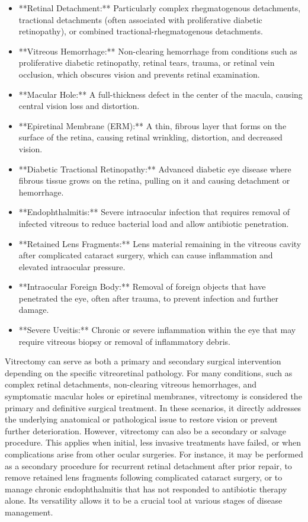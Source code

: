 \begin{itemize}
  \item **Retinal Detachment:** Particularly complex rhegmatogenous detachments, tractional detachments (often associated with proliferative diabetic retinopathy), or combined tractional-rhegmatogenous detachments.
  \item **Vitreous Hemorrhage:** Non-clearing hemorrhage from conditions such as proliferative diabetic retinopathy, retinal tears, trauma, or retinal vein occlusion, which obscures vision and prevents retinal examination.
  \item **Macular Hole:** A full-thickness defect in the center of the macula, causing central vision loss and distortion.
  \item **Epiretinal Membrane (ERM):** A thin, fibrous layer that forms on the surface of the retina, causing retinal wrinkling, distortion, and decreased vision.
  \item **Diabetic Tractional Retinopathy:** Advanced diabetic eye disease where fibrous tissue grows on the retina, pulling on it and causing detachment or hemorrhage.
  \item **Endophthalmitis:** Severe intraocular infection that requires removal of infected vitreous to reduce bacterial load and allow antibiotic penetration.
  \item **Retained Lens Fragments:** Lens material remaining in the vitreous cavity after complicated cataract surgery, which can cause inflammation and elevated intraocular pressure.
  \item **Intraocular Foreign Body:** Removal of foreign objects that have penetrated the eye, often after trauma, to prevent infection and further damage.
  \item **Severe Uveitis:** Chronic or severe inflammation within the eye that may require vitreous biopsy or removal of inflammatory debris.
\end{itemize}

Vitrectomy can serve as both a primary and secondary surgical intervention depending on the specific vitreoretinal pathology. For many conditions, such as complex retinal detachments, non-clearing vitreous hemorrhages, and symptomatic macular holes or epiretinal membranes, vitrectomy is considered the primary and definitive surgical treatment. In these scenarios, it directly addresses the underlying anatomical or pathological issue to restore vision or prevent further deterioration. However, vitrectomy can also be a secondary or salvage procedure. This applies when initial, less invasive treatments have failed, or when complications arise from other ocular surgeries. For instance, it may be performed as a secondary procedure for recurrent retinal detachment after prior repair, to remove retained lens fragments following complicated cataract surgery, or to manage chronic endophthalmitis that has not responded to antibiotic therapy alone. Its versatility allows it to be a crucial tool at various stages of disease management.

